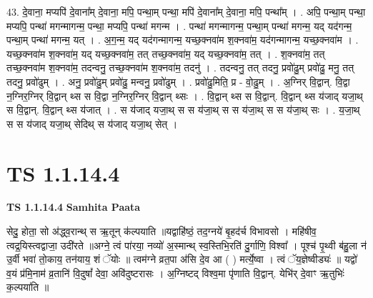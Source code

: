 \documentclass[17pt]{extarticle}
\begin{document}
43. दे॒वाना॒ मप्यपि॑ दे॒वाना᳚म् दे॒वाना॒ मपि॒ पन्था॒म् पन्था॒ मपि॑ दे॒वाना᳚म् दे॒वाना॒ मपि॒ पन्था᳚म् । . अपि॒ पन्था॒म् पन्था॒ मप्यपि॒ पन्था॑ मगन्मागन्म॒ पन्था॒ मप्यपि॒ पन्था॑ मगन्म । . पन्था॑ मगन्मागन्म॒ पन्था॒म् पन्था॑ मगन्म॒ यद् यद॑गन्म॒ पन्था॒म् पन्था॑ मगन्म॒ यत् । . अ॒ग॒न्म॒ यद् यद॑गन्मागन्म॒ यच्छ॒क्नवा॑म श॒क्नवा॑म॒ यद॑गन्मागन्म॒ यच्छ॒क्नवा॑म । . यच्छ॒क्नवा॑म श॒क्नवा॑म॒ यद् यच्छ॒क्नवा॑म॒ तत् तच्छ॒क्नवा॑म॒ यद् यच्छ॒क्नवा॑म॒ तत् । . श॒क्नवा॑म॒ तत् तच्छ॒क्नवा॑म श॒क्नवा॑म॒ तदन्वनु॒ तच्छ॒क्नवा॑म श॒क्नवा॑म॒ तदनु॑ । . तदन्वनु॒ तत् तदनु॒ प्रवो॑ढु॒म् प्रवो॑ढु॒ मनु॒ तत् तदनु॒ प्रवो॑ढुम् । . अनु॒ प्रवो॑ढु॒म् प्रवो॑ढु॒ मन्वनु॒ प्रवो॑ढुम् । . प्रवो॑ढु॒मिति॒ प्र - वो॒ढु॒म् । . अ॒ग्निर् वि॒द्वान्. वि॒द्वा न॒ग्निर॒ग्निर् वि॒द्वान् थ्स स वि॒द्वा न॒ग्निर॒ग्निर् वि॒द्वान् थ्सः । . वि॒द्वान् थ्स स वि॒द्वान्. वि॒द्वान् थ्स य॑जाद् यजा॒थ् स वि॒द्वान्. वि॒द्वान् थ्स य॑जात् । . स य॑जाद् यजा॒थ् स स य॑जा॒थ् स स य॑जा॒थ् स स य॑जा॒थ् सः । . य॒जा॒थ् स स य॑जाद् यजा॒थ् सेदिथ् स य॑जाद् यजा॒थ् सेत् । \newline
\pagebreak
{}
\section*{ TS 1.1.14.4 }

\textbf{TS 1.1.14.4 } \newline
\textbf{Samhita Paata} \newline

सेदु॒ होता॒ सो अ॑द्ध्व॒रान्थ् स ऋ॒तून् क॑ल्पयाति ॥यद्वाहि॑ष्ठं॒ तद॒ग्नये॑ बृ॒हद॑र्च विभावसो । महि॑षीव॒ त्वद्र॒यिस्त्वद्वाजा॒ उदी॑रते ॥अग्ने॒ त्वं पा॑रया॒ नव्यो॑ अ॒स्मान्थ् स्व॒स्तिभि॒रति॑ दु॒र्गाणि॒ विश्वा᳚ । पूश्च॑ पृ॒थ्वी ब॑हु॒ला न॑ उ॒र्वी भवा॑ तो॒काय॒ तन॑याय॒ शं ॅयोः ॥ त्वम॑ग्ने व्रत॒पा अ॑सि दे॒व आ ( ) मर्त्ये॒ष्वा । त्वं ॅय॒ज्ञेष्वीड्यः॑ ॥ यद्वो॑ व॒यं प्र॑मि॒नाम॑ व्र॒तानि॑ वि॒दुषां᳚ देवा॒ अवि॑दुष्टरासः । अ॒ग्निष्टद् विश्व॒मा पृ॑णाति वि॒द्वान्. येभि॑र् दे॒वाꣳ ऋ॒तुभिः॑ क॒ल्पया॑ति ॥ \newline
\end{document}
